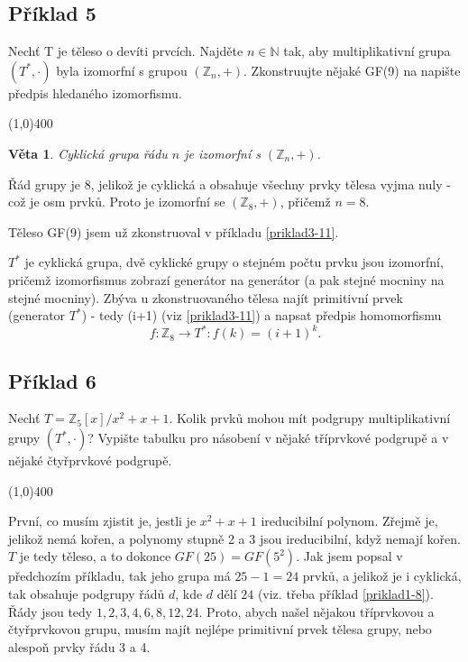 \documentclass{article}
\newtheorem{veta}{Věta}[section]
\begin{document}
\subsection{Příklad 5}
Nechť T je těleso o devíti prvcích. Najděte $n \in \mathbb{N}$ tak, aby multiplikativní grupa $(T^*,\cdot)$ byla izomorfní s grupou $(\mathbb{Z}_n,+)$. Zkonstruujte nějaké GF(9) na napište předpis hledaného izomorfismu.

\line(1,0){400}

\begin{veta}
Cyklická grupa řádu $n$ je izomorfní s $(\mathbb{Z}_n, +)$.
\end{veta}

Řád grupy je $8$, jelikož je cyklická a obsahuje všechny prvky tělesa vyjma nuly - což je osm prvků. Proto je izomorfní se $(\mathbb{Z}_8, +)$, přičemž $n=8$. 

Těleso GF(9) jsem už zkonstruoval v příkladu \ref{priklad3-11}.

$T^*$ je cyklická grupa, dvě cyklické grupy o stejném počtu prvku jsou izomorfní, pričemž izomorfismus zobrazí generátor na generátor (a pak stejné mocniny na stejné mocniny).
Zbýva u zkonstruovaného tělesa najít primitivní prvek (generator $T^*$) - tedy (i+1) (viz \ref{priklad3-11}) a napsat předpis homomorfismu
\[ f: \mathbb{Z}_8 \rightarrow T^*: f(k)=(i+1)^k. \] 

\subsection{Příklad 6}
Nechť $T = \mathbb{Z}_5[x]/x^2+x+1$. Kolik prvků mohou mít podgrupy multiplikativní grupy $(T^*,\cdot)$? Vypište tabulku pro násobení v nějaké tříprvkové podgrupě a v nějaké čtyřprvkové podgrupě.

\line(1,0){400}

První, co musím zjistit je, jestli je $x^2+x+1$ ireducibilní polynom. Zřejmě je, jelikož nemá kořen, a polynomy stupně 2 a 3 jsou ireducibilní, když nemají kořen. $T$ je tedy těleso, a to dokonce $GF(25) = GF(5^2)$. Jak jsem popsal v předchozím příkladu, tak jeho grupa má $25-1=24$ prvků, a jelikož je i cyklická, tak obsahuje podgrupy řádů $d$, kde $d$ dělí $24$ (viz. třeba příklad \ref{priklad1-8}). Řády jsou tedy $1,2,3,4,6,8,12,24$. Proto, abych našel nějakou tříprvkovou a čtyřprvkovou grupu, musím najít nejlépe primitivní prvek tělesa grupy, nebo alespoň prvky řádu 3 a 4. 
\end{document}
